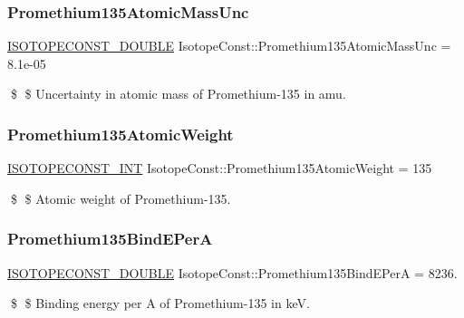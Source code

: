 \subsubsection{\texorpdfstring{Promethium135\+Atomic\+Mass\+Unc}{Promethium135AtomicMassUnc}}
{\footnotesize\ttfamily \mbox{\hyperlink{group___isotope_const-_macros_ga8f45a7272ce02c0b4c65c44636ed719a}{I\+S\+O\+T\+O\+P\+E\+C\+O\+N\+S\+T\+\_\+\+D\+O\+U\+B\+LE}} Isotope\+Const\+::\+Promethium135\+Atomic\+Mass\+Unc = 8.\+1e-\/05}

\$ \$ Uncertainty in atomic mass of Promethium-\/135 in amu. \mbox{\label{group___isotope_const-_promethium-_pm135_gaae97f82ad14896394fdf1dc1ae7e6169}} 
\subsubsection{\texorpdfstring{Promethium135\+Atomic\+Weight}{Promethium135AtomicWeight}}
{\footnotesize\ttfamily \mbox{\hyperlink{group___isotope_const-_macros_ga5f18360b3e99483a35c32d789e62621c}{I\+S\+O\+T\+O\+P\+E\+C\+O\+N\+S\+T\+\_\+\+I\+NT}} Isotope\+Const\+::\+Promethium135\+Atomic\+Weight = 135}

\$ \$ Atomic weight of Promethium-\/135. \mbox{\label{group___isotope_const-_promethium-_pm135_gaa5fda070d0d7d74e0930f354bebad69c}} 
\subsubsection{\texorpdfstring{Promethium135\+Bind\+E\+PerA}{Promethium135BindEPerA}}
{\footnotesize\ttfamily \mbox{\hyperlink{group___isotope_const-_macros_ga8f45a7272ce02c0b4c65c44636ed719a}{I\+S\+O\+T\+O\+P\+E\+C\+O\+N\+S\+T\+\_\+\+D\+O\+U\+B\+LE}} Isotope\+Const\+::\+Promethium135\+Bind\+E\+PerA = 8236.}

\$ \$ Binding energy per A of Promethium-\/135 in keV. \mbox{\label{group___isotope_const-_promethium-_pm135_gac7d0a56333d6a231e958581e6ab3c596}} 
